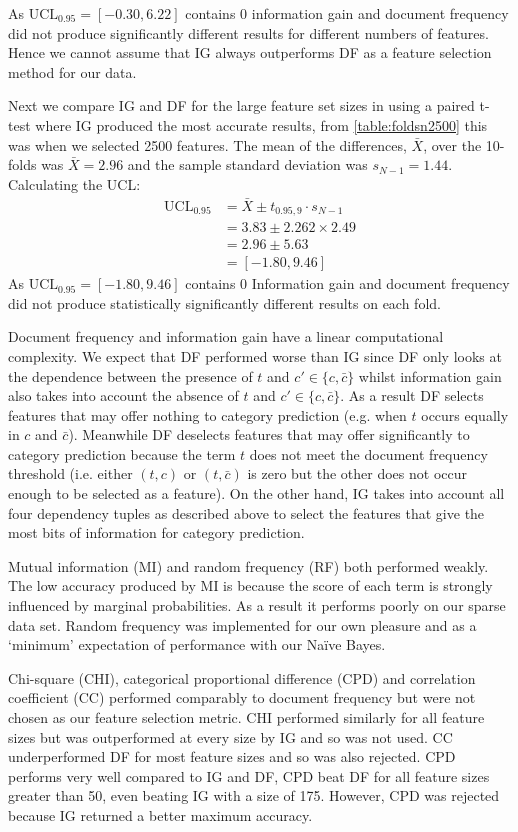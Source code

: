\documentclass[10pt, a4paper]{article}
\begin{document}
As $\text{UCL}_{0.95} = [-0.30, 6.22]$ contains 0 information gain and document frequency did not produce significantly different results for different numbers of features. Hence we cannot assume that IG always outperforms DF as a feature selection method for our data. 

Next we compare IG and DF for the large feature set sizes in  using a paired t-test where IG produced the most accurate results, from \autoref{table:foldsn2500} this was when we selected 2500 features. The mean of the differences, $\bar{X}$, over the 10-folds was $\bar{X} = 2.96$ and the sample standard deviation was $s_{N-1} = 1.44$. Calculating the UCL:
\begin{align*}
\text{UCL}_{0.95} &= \bar{X} \pm t_{0.95,9} \cdot s_{N-1} \\
  &= 3.83 \pm 2.262 \times 2.49 \\
  &= 2.96 \pm 5.63 \\
  &= [-1.80, 9.46]
\end{align*}
As $\text{UCL}_{0.95} = [-1.80, 9.46]$ contains 0 Information gain and document frequency did not produce statistically significantly different results on each fold. 

Document frequency and information gain have a linear computational complexity. We expect that DF performed worse than IG since DF only looks at the dependence between the presence of $t$ and $c' \in \{c,\bar{c}\}$ whilst information gain also takes into account the absence of $t$ and $c' \in \{c,\bar{c}\}$. As a result DF selects features that may offer nothing to category prediction (e.g. when $t$ occurs equally in $c$ and $\bar{c}$). Meanwhile DF deselects features that may offer significantly to category prediction because the term $t$ does not meet the document frequency threshold (i.e. either $(t,c)$ or $(t,\bar{c})$ is zero but the other does not occur enough to be selected as a feature). On the other hand, IG takes into account all four dependency tuples as described above to select the features that give the most bits of information for category prediction.

Mutual information (MI) and random frequency (RF) both performed weakly. The low accuracy produced by MI is because the score of each term is strongly influenced by marginal probabilities. As a result it performs poorly on our sparse data set. Random frequency was implemented for our own pleasure and as a `minimum' expectation of performance with our Na\"ive Bayes.

 Chi-square (CHI), categorical proportional difference (CPD) and correlation coefficient (CC) performed comparably to document frequency but were not chosen as our feature selection metric. CHI performed similarly for all feature sizes but was outperformed at every size by IG and so was not used. CC underperformed DF for most feature sizes and so was also rejected. CPD performs very well compared to IG and DF, CPD beat DF for all feature sizes greater than 50, even beating IG with a size of 175. However, CPD was rejected because IG returned a better maximum accuracy.
\end{document}
